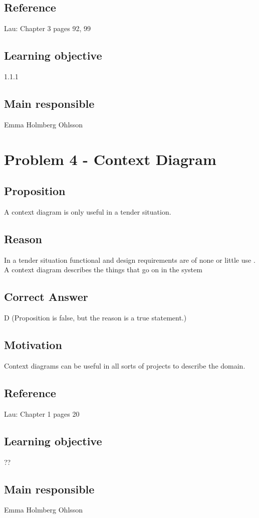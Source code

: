 \documentclass[a4paper]{article}
\begin{document}
\subsection{Reference}
Lau: Chapter 3 pages 92, 99
\subsection{Learning objective}
1.1.1
\subsection{Main responsible}
Emma Holmberg Ohlsson


\section{Problem 4 - Context Diagram}
\subsection{Proposition}
A context diagram is only useful in a tender situation.
\subsection{Reason}
In a tender situation functional and design requirements are of none or little use . A context diagram describes the things that go on in the system
\subsection{Correct Answer}
D (Proposition is false, but the reason is a true statement.)
\subsection{Motivation}
Context diagrams can be useful in all sorts of projects to describe the domain.
\subsection{Reference}
Lau: Chapter 1 pages 20
\subsection{Learning objective}
??
\subsection{Main responsible}
Emma Holmberg Ohlsson
\end{document}
